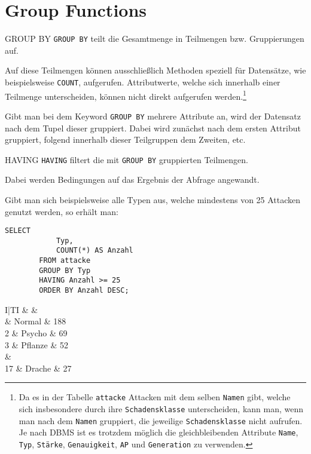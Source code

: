 \section{Group Functions}

\begin{sql}{GROUP BY}
    \texttt{GROUP BY} teilt die Gesamtmenge in Teilmengen bzw. Gruppierungen auf.
    
    Auf diese Teilmengen können ausschließlich Methoden speziell für Datensätze, wie beispielsweise \texttt{COUNT}, aufgerufen.
    Attributwerte, welche sich innerhalb einer Teilmenge unterscheiden, können nicht direkt aufgerufen werden.\footnote{
        Da es in der Tabelle \texttt{attacke} Attacken mit dem selben \texttt{Namen} gibt, welche sich insbesondere durch ihre \texttt{Schadensklasse} unterscheiden, kann man, wenn man nach dem \texttt{Namen} gruppiert, die jeweilige \texttt{Schadensklasse} nicht aufrufen.
        Je nach DBMS ist es trotzdem möglich die gleichbleibenden Attribute \texttt{Name}, \texttt{Typ}, \texttt{Stärke}, \texttt{Genauigkeit}, \texttt{AP} und \texttt{Generation} zu verwenden.
    }

    Gibt man bei dem Keyword \texttt{GROUP BY} mehrere Attribute an, wird der Datensatz nach dem Tupel dieser gruppiert.
    Dabei wird zunächst nach dem ersten Attribut gruppiert, folgend innerhalb dieser Teilgruppen dem Zweiten, etc. 
\end{sql}

\begin{sql}{HAVING}
    \texttt{HAVING} filtert die mit \texttt{GROUP BY} gruppierten Teilmengen.
    
    Dabei werden Bedingungen auf das Ergebnis der Abfrage angewandt.

    Gibt man sich beispielsweise alle Typen aus, welche mindestens von 25 Attacken genutzt werden, so erhält man:
    
    \begin{lstlisting}[style=SqlInputStyle]
        SELECT
            Typ,
            COUNT(*) AS Anzahl
        FROM attacke
        GROUP BY Typ
        HAVING Anzahl >= 25
        ORDER BY Anzahl DESC;
    \end{lstlisting}

    \begin{tabular}{I|TI}
        &  &  \\ & Normal & 188 \\
        2 & Psycho & 69 \\
        3 & Pflanze & 52 \\
         &  \\
        17 & Drache & 27 \\
    \end{tabular}
\end{sql}

